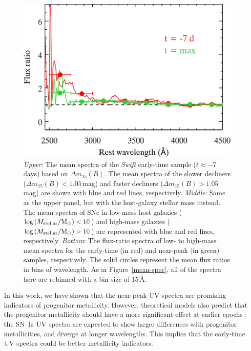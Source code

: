 \documentclass[useAMS,usenatbib]{mn2e}
\newcommand{\deltam}{\ensuremath{\Delta m_{15}}}
\begin{document}
\begin{figure}
		\vspace{0.25cm}
		\includegraphics[scale=0.47]{plot/uv_mass_comp.pdf}
                \caption{{\it Upper}: The mean spectra of the {\it Swift} early-time sample ($t \approx -7$\,days) based on $\deltam(B)$. The mean spectra of the slower decliners ($\deltam(B)<1.05$\,mag) and faster decliners ($\deltam(B)>1.05$\,mag) are shown with blue and red lines, respectively. {\it Middle}: Same as the upper panel, but with the host-galaxy stellar mass instead. The mean spectra of SNe in low-mass host galaxies ($\log\,(M_{\rm stellar}/{\rm M}_{\odot})<10$) and high-mass galaxies ($\log\,(M_{\rm stellar}/{\rm M}_{\odot})>10$) are represented with blue and red lines, respectively. {\it Bottom}: The flux-ratio spectra of low- to high-mass mean spectra for the early-time (in red) and near-peak (in green) samples, respectively. The solid circles represent the mean flux ratios in bins of wavelength. As in Figure~\ref{mean-spec}, all of the spectra here are rebinned with a bin size of 15\,\AA.}
        \label{mean-spec-premax}
\end{figure}

In this work, we have shown that the near-peak UV spectra are promising indicators of progenitor metallicity. However, theoretical models also predict that the progenitor metallicity should have a more significant effect at earlier epochs \citep{2000ApJ...530..966L}: the SN~Ia UV spectra are expected to show larger differences with progenitor metallicities, and diverge at longer wavelengths. This implies that the early-time UV spectra could be better metallicity indicators.
\end{document}
